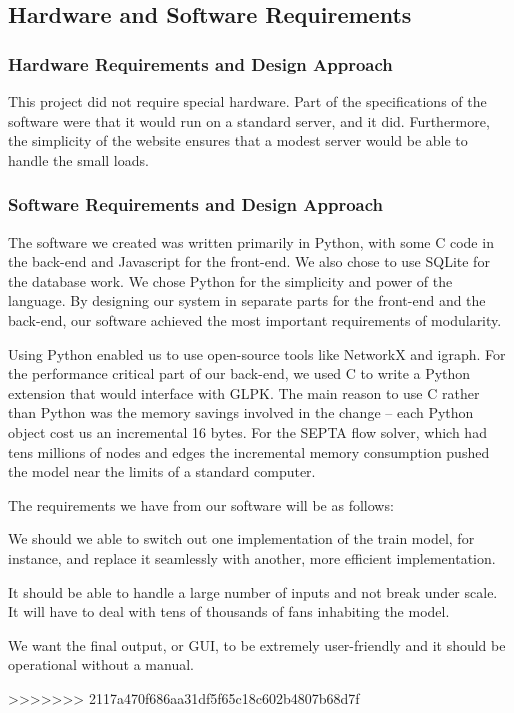\subsection{Hardware and Software Requirements}
\subsubsection{Hardware Requirements and Design Approach}
This project did not require special hardware. Part of the
specifications of the software were that it would run on a standard
server, and it did. Furthermore, the simplicity of the website ensures
that a modest server would be able to handle the small loads.

\subsubsection{ Software Requirements and Design Approach}
The software we created was written primarily in Python, with some C
code in the back-end and Javascript for the front-end. We also chose
to use SQLite for the database work. We chose Python for the
simplicity and power of the language. By designing our system in
separate parts for the front-end and the back-end, our software
achieved the most important requirements of modularity.

Using Python enabled us to use open-source tools like
NetworkX\cite{networkx} and igraph\cite{igraph}. For the performance
critical part of our back-end, we used C to write a Python extension
that would interface with GLPK\cite{glpk}. The main reason to use C
rather than Python was the memory savings involved in the change --
each Python object cost us an incremental 16 bytes. For the SEPTA flow
solver, which had tens millions of nodes and edges the incremental
memory consumption pushed the model near the limits of a standard
computer.

The requirements we have from our software will be as follows:
\label{requirements}
\begin{description}[style=nextline]
    \item[Modularity] We should we able to switch out one
  implementation of the train model, for instance, and replace it
  seamlessly with another, more efficient implementation.
    \item[Scalability] It should be able to handle a large number of
  inputs and not break under scale. It will have to deal with tens of
  thousands of fans inhabiting the model.
    \item[User-Friendliness] We want the final output, or GUI, to be
  extremely user-friendly and it should be operational without a
  manual.
\end{description}
>>>>>>> 2117a470f686aa31df5f65c18c602b4807b68d7f
